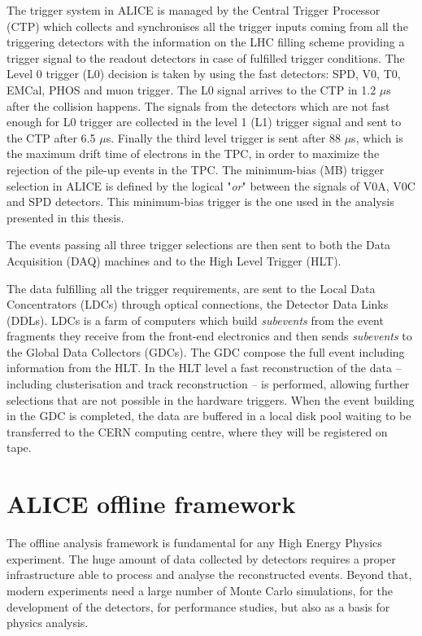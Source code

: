 The trigger system in ALICE is managed by the Central Trigger Processor (CTP) \cite{alice_trigger} 
which collects and synchronises all the trigger inputs coming from all the triggering detectors 
with the information on the LHC filling scheme providing a trigger signal to the readout detectors
in case of fulfilled trigger conditions. 
The Level 0 trigger (L0) decision is taken by using the fast detectors: SPD, V0, T0, EMCal, PHOS and 
muon trigger. The L0 signal arrives to the CTP in 1.2 $\mu$s after the collision happens. 
The signals from the detectors which are not fast enough for L0 trigger are collected in the level 1
(L1) trigger signal and sent to the CTP after 6.5 $\mu$s. 
Finally the third level trigger is sent after 88 $\mu$s, which is the maximum drift time of electrons
in the TPC, in order to maximize the rejection of the pile-up events in the TPC.
The minimum-bias (MB) trigger  selection in ALICE is defined by the logical "\textit{or}" between the
signals of V0A, V0C and SPD detectors. This minimum-bias trigger is the one used in the analysis
presented in this thesis.

The events passing all three trigger selections are then sent to both the Data Acquisition (DAQ) machines 
and to the High Level Trigger (HLT).


The data fulfilling all the trigger requirements, are sent to the Local Data Concentrators (LDCs)
through optical connections, the Detector Data Links (DDLs).
LDCs is a farm of computers which build \textit{subevents} from the event fragments they receive from
the front-end electronics and then sends \textit{subevents} to the Global Data Collectors (GDCs).
The GDC compose the full event including information from the HLT.
In the HLT level a fast reconstruction of the data -- including clusterisation and track reconstruction --
is performed, allowing further selections that are not possible in the hardware triggers.
When the event building in the GDC is completed, the data are buffered in a local disk pool waiting 
to be transferred to the CERN computing centre, where they will be registered on tape.

%
%
\section{ALICE offline framework} \label{sec:offline}

The offline analysis framework is fundamental for any High Energy Physics experiment.
The huge amount of data collected by detectors requires a proper infrastructure able to process and 
analyse the reconstructed events.
Beyond that, modern experiments need a large number of Monte Carlo simulations, for the development of
the detectors, for performance studies, but also as a basis for physics analysis.


